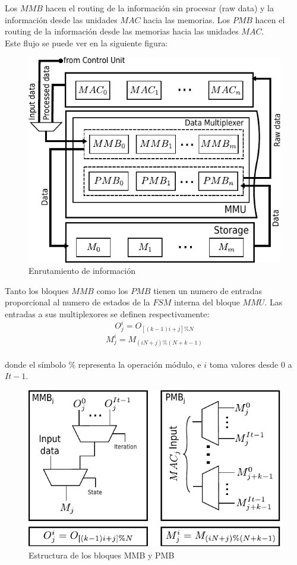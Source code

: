 \documentclass[a4paper]{article}
\begin{document}
Los $MMB$ hacen el routing de la información sin procesar (raw data) y la información desde las unidades $MAC$ hacia las memorias.
Los $PMB$ hacen el routing de la información desde las memorias hacia las unidades $MAC$.\\

Este flujo se puede ver en la siguiente figura:
\begin{figure}[H]
\centering
\includegraphics[scale=0.9]{muxes}
\caption{ Enrutamiento de información}
\label{mmu_routing}
\end{figure}
Tanto los bloques $MMB$ como los $PMB$ tienen un numero de entradas proporcional al numero de estados de la $FSM$ interna del bloque $MMU$. 
Las entradas a sus multiplexores se definen respectivamente:
\begin{equation}%
  O_j^i = O_{[(k-1)i+j]\%N}
\end{equation}
\begin{equation}%
  M_j^i = M_{(iN+j)\%(N+k-1)}
\end{equation}
\\
donde el símbolo $ \% $ representa la operación módulo, e $i$ toma valores desde $0$ a $It-1$.

\bigskip
\bigskip
\begin{figure}[H]
\centering
\includegraphics{muxes_cont}
\caption{ Estructura de los bloques MMB y PMB}
\label{mmu_structure}
\end{figure}
\end{document}
